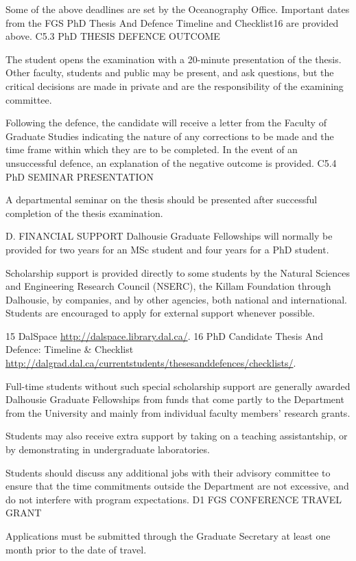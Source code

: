 \documentclass{article}
\newcommand\elink[1]{\url{#1}}
\begin{document}
Some of the above deadlines are set by the Oceanography Office. Important dates from the FGS PhD Thesis And Defence Timeline and Checklist16 are provided above.
C5.3	PhD THESIS DEFENCE OUTCOME

The student opens the examination with a 20-minute presentation of the thesis. Other faculty, students and public may be present, and ask questions, but the critical decisions are made in private and are the responsibility of the examining committee.

Following the defence, the candidate will receive a letter from the Faculty of Graduate Studies indicating the nature of any corrections to be made and the time frame within which they are to be completed.  In the event of an unsuccessful defence, an explanation of the negative outcome is provided.
C5.4	PhD SEMINAR PRESENTATION

A departmental seminar on the thesis should be presented after successful completion of the thesis examination.

D.	FINANCIAL  SUPPORT
Dalhousie Graduate Fellowships will normally be provided for two years for an MSc student and four years for a PhD student.

Scholarship support is provided directly to some students by the Natural Sciences and Engineering Research Council (NSERC), the Killam Foundation through Dalhousie, by companies, and by other agencies, both national and international. Students are encouraged to apply for external support whenever possible.


15 DalSpace \elink{http://dalspace.library.dal.ca/}.
16 PhD Candidate Thesis And Defence: Timeline \& Checklist \elink{http://dalgrad.dal.ca/currentstudents/thesesanddefences/checklists/}.
 

Full-time students without such special scholarship support are generally awarded Dalhousie Graduate Fellowships from funds that come partly to the Department from the University and mainly from individual faculty members’ research grants.

Students may also receive extra support by taking on a teaching assistantship, or by demonstrating in undergraduate laboratories.

Students should discuss any additional jobs with their advisory committee to ensure that the time commitments outside the Department are not excessive, and do not interfere with program expectations.
D1	FGS CONFERENCE TRAVEL GRANT

Applications must be submitted through the Graduate Secretary at least one month prior to the date of travel.
\end{document}
